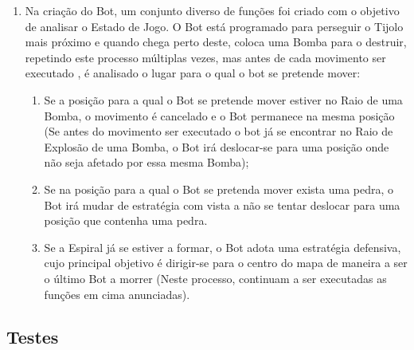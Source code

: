 \documentclass[a4paper]{article}
\begin{document}
\begin{enumerate}
 \item Na criação do Bot, um conjunto diverso de funções foi criado com o objetivo de analisar o Estado de Jogo. O Bot está programado para perseguir o Tijolo mais próximo e quando chega perto deste, coloca uma Bomba para o destruir, repetindo este processo múltiplas vezes, mas antes de cada movimento ser executado , é analisado o lugar para o qual o bot se pretende mover:
 \begin{enumerate}
 \item Se a posição para a qual o Bot se pretende mover estiver no Raio de uma Bomba, o movimento é cancelado e o Bot permanece na mesma posição (Se antes do movimento ser executado o bot já se encontrar no Raio de Explosão de uma Bomba, o Bot irá deslocar-se para uma posição onde não seja afetado por essa mesma Bomba);
 \item Se na posição para a qual o Bot se pretenda mover exista uma pedra, o Bot irá mudar de estratégia com vista a não se tentar deslocar para uma posição que contenha uma pedra.
 \item Se a Espiral já se estiver a formar, o Bot adota uma estratégia defensiva, cujo principal objetivo é dirigir-se para o centro do mapa de maneira a ser o último Bot a morrer (Neste processo, continuam a ser executadas as funções em cima anunciadas). 
 
 \end{enumerate}
\end{enumerate}

\subsection{Testes}
\end{document}
